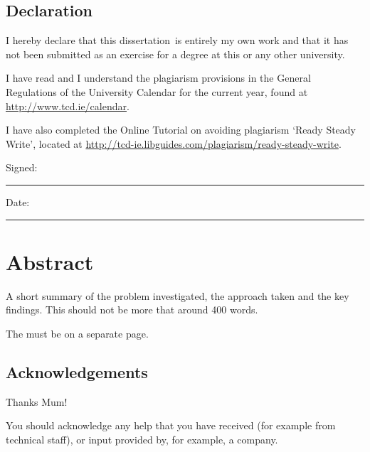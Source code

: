\documentclass[a4paper,oneside,11pt]{book}
\title{\thesistitle}
\author{\authorname}
\newcommand{\typeofthesis}{dissertation} %
\begin{document}

\section*{\Huge{Declaration}}
\vspace{1cm}
I hereby declare that this \typeofthesis\ is entirely my own work and that it has not been submitted as an exercise for a degree at this or any other university.

\vspace{1cm}
I have read and I understand the plagiarism provisions in the General Regulations of the University Calendar for the current year, found at \url{http://www.tcd.ie/calendar}.
\vspace{1cm}

I have also completed the Online Tutorial on avoiding plagiarism `Ready Steady Write', located at \url{http://tcd-ie.libguides.com/plagiarism/ready-steady-write}.
\vspace{3cm}

Signed:~\rule{5cm}{0.3pt}\hfill Date:~\rule{5cm}{0.3pt}

\chapter*{Abstract}
A short summary of the problem investigated, the approach taken and the key findings. This should not be more that around 400 words.

The must be on a separate page.

\newpage
\onehalfspacing\raggedright %

\section*{\Huge{Acknowledgements}}
Thanks Mum!

You should acknowledge any help that you have received (for example from technical staff), or input provided by, for example, a company.
\tableofcontents
\listoffigures
\listoftables
\newpage
\end{document}

